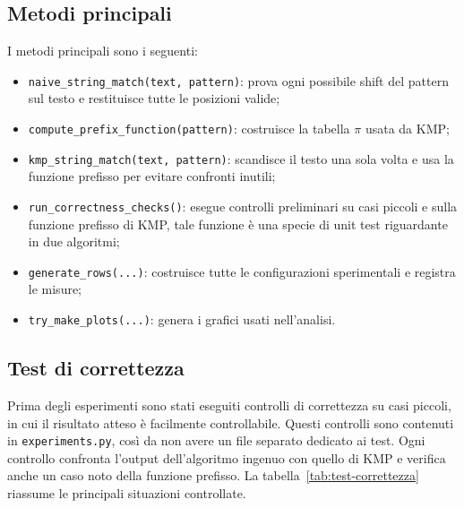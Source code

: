 \documentclass{article}
\begin{document}
\subsection{Metodi principali}
I metodi principali sono i seguenti:
\begin{itemize}
    \item \texttt{naive\_string\_match(text, pattern)}: prova ogni possibile shift del pattern sul testo e restituisce tutte le posizioni valide;
    \item \texttt{compute\_prefix\_function(pattern)}: costruisce la tabella $\pi$ usata da KMP;
    \item \texttt{kmp\_string\_match(text, pattern)}: scandisce il testo una sola volta e usa la funzione prefisso per evitare confronti inutili;
    \item \texttt{run\_correctness\_checks()}: esegue controlli preliminari su casi piccoli e sulla funzione prefisso di KMP, tale funzione è una specie di unit test riguardante in due algoritmi;
    \item \texttt{generate\_rows(...)}: costruisce tutte le configurazioni sperimentali e registra le misure;
    \item \texttt{try\_make\_plots(...)}: genera i grafici usati nell'analisi.
\end{itemize}

\subsection{Test di correttezza}
Prima degli esperimenti sono stati eseguiti controlli di correttezza su casi piccoli, in cui il risultato atteso è facilmente controllabile. Questi controlli sono contenuti in \texttt{experiments.py}, così da non avere un file separato dedicato ai test. Ogni controllo confronta l'output dell'algoritmo ingenuo con quello di KMP e verifica anche un caso noto della funzione prefisso. La tabella~\ref{tab:test-correttezza} riassume le principali situazioni controllate.
\end{document}
